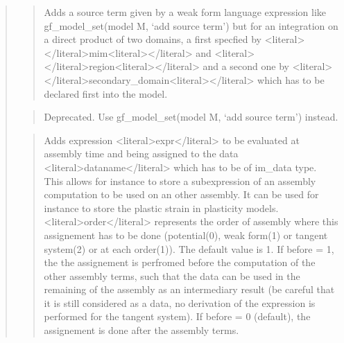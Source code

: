 \documentclass[a4paper,11pt,english]{sphinxmanual}
\begin{document}
\begin{quote}
\sphinxAtStartPar
{}
\begin{quote}

\sphinxAtStartPar
Adds a source term given by a weak form language expression like
gf\_model\_set(model M, ‘add source term’) but for an integration on a direct
product of two domains, a first specfied by \textless{}literal\textgreater{}\textless{}/literal\textgreater{}mim\textless{}literal\textgreater{}\textless{}/literal\textgreater{} and \textless{}literal\textgreater{}\textless{}/literal\textgreater{}region\textless{}literal\textgreater{}\textless{}/literal\textgreater{}
and a second one by \textless{}literal\textgreater{}\textless{}/literal\textgreater{}secondary\_domain\textless{}literal\textgreater{}\textless{}/literal\textgreater{} which has to be declared
first into the model.
\end{quote}

\sphinxAtStartPar
{}
\begin{quote}

\sphinxAtStartPar
Deprecated. Use gf\_model\_set(model M, ‘add source term’) instead.
\end{quote}

\sphinxAtStartPar
{}
\begin{quote}

\sphinxAtStartPar
Adds expression \textless{}literal\textgreater{}expr\textless{}/literal\textgreater{} to be evaluated at assembly time and being
assigned to the data \textless{}literal\textgreater{}dataname\textless{}/literal\textgreater{} which has to be of im\_data type.
This allows for instance to store a sub\sphinxhyphen{}expression of an assembly
computation to be used on an other assembly. It can be used for instance
to store the plastic strain in plasticity models.
\textless{}literal\textgreater{}order\textless{}/literal\textgreater{} represents the order of assembly where this assignement has to be
done (potential(0), weak form(1) or tangent system(2) or at each
order(\sphinxhyphen{}1)). The default value is 1.
If before = 1, the the assignement is perfromed before the computation
of the other assembly terms, such that the data can be used in the
remaining of the assembly as an intermediary result (be careful that it is
still considered as a data, no derivation of the expression is performed
for the tangent system).
If before = 0 (default), the assignement is done after the assembly terms.
\end{quote}


\end{quote}
\end{document}
